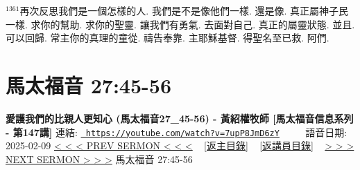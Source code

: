 \documentclass{book}
\begin{document}
$^{1361}$再次反思我們是一個怎樣的人.
我們是不是像他們一樣.
還是像.
真正屬神子民一樣.
求你的幫助.
求你的聖靈.
讓我們有勇氣.
去面對自己.
真正的屬靈狀態.
並且.
可以回歸.
常主你的真理的童從.
禱告奉靠.
主耶穌基督.
得聖名至已救.
阿們.
\newpage



\section{馬太福音 27:45-56}
\label{sec:7upP8JmD6zY}
\textbf{愛護我們的比親人更知心 (馬太福音27\_45-56) - 黃紹權牧師  [馬太福音信息系列 - 第147講]}
\newline
\newline
連結: \href{https://youtube.com/watch?v=7upP8JmD6zY}{\texttt{ https://youtube.com/watch?v=7upP8JmD6zY}} ~~~~ 語音日期: 2025-02-09 
\newline
\newline
\hyperref[sec:oCpi7n8ictU]{< < < PREV SERMON < < <}
~
\hyperlink{toc}{[返主目錄]}
~
\hyperref[ch:preacher10]{[返講員目錄]}
~
\hyperref[sec:MfR5_HAo14I]{> > > NEXT SERMON > > >}
\newline
\newline
馬太福音 27:45-56
\newline
\end{document}
